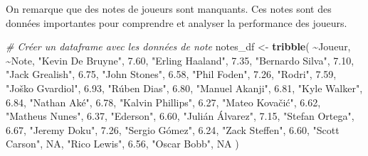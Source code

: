\documentclass[
]{article}
\newenvironment{Shaded}{\begin{snugshade}}{\end{snugshade}}
\newcommand{\CommentTok}[1]{\textcolor[rgb]{0.56,0.35,0.01}{\textit{#1}}}
\newcommand{\ConstantTok}[1]{\textcolor[rgb]{0.56,0.35,0.01}{#1}}
\newcommand{\FloatTok}[1]{\textcolor[rgb]{0.00,0.00,0.81}{#1}}
\newcommand{\FunctionTok}[1]{\textcolor[rgb]{0.13,0.29,0.53}{\textbf{#1}}}
\newcommand{\NormalTok}[1]{#1}
\newcommand{\OtherTok}[1]{\textcolor[rgb]{0.56,0.35,0.01}{#1}}
\newcommand{\SpecialCharTok}[1]{\textcolor[rgb]{0.81,0.36,0.00}{\textbf{#1}}}
\newcommand{\StringTok}[1]{\textcolor[rgb]{0.31,0.60,0.02}{#1}}
\begin{document}
On remarque que des notes de joueurs sont manquants. Ces notes sont des
données importantes pour comprendre et analyser la performance des
joueurs.

\begin{Shaded}
\begin{Highlighting}[]
\CommentTok{\# Créer un dataframe avec les données de note}
\NormalTok{notes\_df }\OtherTok{\textless{}{-}} \FunctionTok{tribble}\NormalTok{(}
  \SpecialCharTok{\textasciitilde{}}\NormalTok{Joueur,               }\SpecialCharTok{\textasciitilde{}}\NormalTok{Note,}
  \StringTok{"Kevin De Bruyne"}\NormalTok{,     }\FloatTok{7.60}\NormalTok{,}
  \StringTok{"Erling Haaland"}\NormalTok{,      }\FloatTok{7.35}\NormalTok{,}
  \StringTok{"Bernardo Silva"}\NormalTok{,      }\FloatTok{7.10}\NormalTok{,}
  \StringTok{"Jack Grealish"}\NormalTok{,       }\FloatTok{6.75}\NormalTok{,}
  \StringTok{"John Stones"}\NormalTok{,         }\FloatTok{6.58}\NormalTok{,}
  \StringTok{"Phil Foden"}\NormalTok{,          }\FloatTok{7.26}\NormalTok{,}
  \StringTok{"Rodri"}\NormalTok{,               }\FloatTok{7.59}\NormalTok{,}
  \StringTok{"Joško Gvardiol"}\NormalTok{,      }\FloatTok{6.93}\NormalTok{,}
  \StringTok{"Rúben Dias"}\NormalTok{,          }\FloatTok{6.80}\NormalTok{,}
  \StringTok{"Manuel Akanji"}\NormalTok{,       }\FloatTok{6.81}\NormalTok{,}
  \StringTok{"Kyle Walker"}\NormalTok{,         }\FloatTok{6.84}\NormalTok{,}
  \StringTok{"Nathan Aké"}\NormalTok{,          }\FloatTok{6.78}\NormalTok{,}
  \StringTok{"Kalvin Phillips"}\NormalTok{,     }\FloatTok{6.27}\NormalTok{,}
  \StringTok{"Mateo Kovačić"}\NormalTok{,       }\FloatTok{6.62}\NormalTok{,}
  \StringTok{"Matheus Nunes"}\NormalTok{,       }\FloatTok{6.37}\NormalTok{,}
  \StringTok{"Ederson"}\NormalTok{,             }\FloatTok{6.60}\NormalTok{,}
  \StringTok{"Julián Álvarez"}\NormalTok{,      }\FloatTok{7.15}\NormalTok{,}
  \StringTok{"Stefan Ortega"}\NormalTok{,       }\FloatTok{6.67}\NormalTok{,}
  \StringTok{"Jeremy Doku"}\NormalTok{,         }\FloatTok{7.26}\NormalTok{,}
  \StringTok{"Sergio Gómez"}\NormalTok{,        }\FloatTok{6.24}\NormalTok{,}
  \StringTok{"Zack Steffen"}\NormalTok{,        }\FloatTok{6.60}\NormalTok{,}
  \StringTok{"Scott Carson"}\NormalTok{,        }\ConstantTok{NA}\NormalTok{,}
  \StringTok{"Rico Lewis"}\NormalTok{,          }\FloatTok{6.56}\NormalTok{,}
  \StringTok{"Oscar Bobb"}\NormalTok{,          }\ConstantTok{NA}
\NormalTok{)}
\end{Highlighting}
\end{Shaded}
\end{document}

